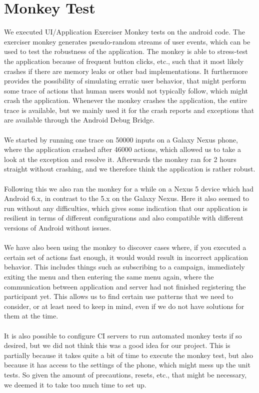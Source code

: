 
\section{Monkey Test}
\label{sec:monkey_test}
We executed UI/Application Exerciser Monkey tests on the android code. The exerciser monkey generates pseudo-random streams of user events, which can be used to test the robustness of the application. The monkey is able to stress-test the application because of frequent button clicks, etc., such that it most likely crashes if there are memory leaks or other bad implementations. It furthermore provides the possibility of simulating erratic user behavior, that might perform some trace of actions that human users would not typically follow, which might crash the application. Whenever the monkey crashes the application, the entire trace is available, but we mainly used it for the crash reports and exceptions that are available through the Android Debug Bridge. 
\\\\
We started by running one trace on 50000 inputs on a Galaxy Nexus phone, where the application crashed after 46000 actions, which allowed us to take a look at the exception and resolve it. Afterwards the monkey ran for 2 hours straight without crashing, and we therefore think the application is rather robust.
\\\\
Following this we also ran the monkey for a while on a Nexus 5 device which had Android 6.x, in contrast to the 5.x on the Galaxy Nexus. Here it also seemed to run without any difficulties, which gives some indication that our application is resilient in terms of different configurations and also compatible with different versions of Android without issues.
\\\\
We have also been using the monkey to discover cases where, if you executed a certain set of actions fast enough, it would would result in incorrect application behavior. This includes things such as subscribing to a campaign, immediately exiting the menu and then entering the same menu again, where the communication between application and server had not finished registering the participant yet. This allows us to find certain use patterns that we need to consider, or at least need to keep in mind, even if we do not have solutions for them at the time. 
\\\\
It is also possible to configure CI servers to run automated monkey tests if so desired, but we did not think this was a good idea for our project. This is partially because it takes quite a bit of time to execute the monkey test, but also because it has access to the settings of the phone, which might mess up the unit tests. So given the amount of precautions, resets, etc., that might be necessary, we deemed it to take too much time to set up. 
